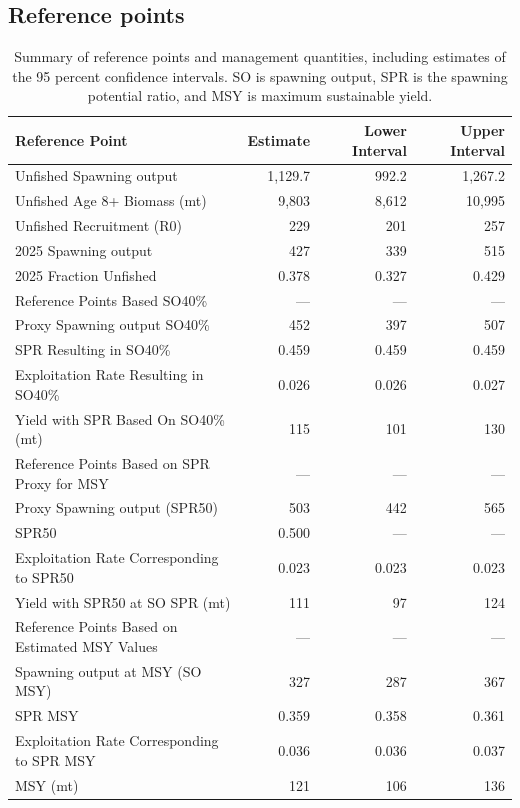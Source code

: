 \documentclass[
]{scrartcl}
\begin{document}
\subsection*{Reference points}\label{reference-points}

\begingroup
\fontsize{9.0pt}{10.8pt}\selectfont

\begin{longtable}{lrrr}

\caption{\label{tbl-ref-points-es-1}Summary of reference points and
management quantities, including estimates of the 95 percent confidence
intervals. SO is spawning output, SPR is the spawning potential ratio,
and MSY is maximum sustainable yield.}

\tabularnewline

\toprule
Reference Point & Estimate & Lower Interval & Upper Interval \\ 
\midrule\addlinespace[2.5pt]
Unfished Spawning output & 1,129.7 & 992.2 & 1,267.2 \\ 
Unfished Age 8+ Biomass (mt) & 9,803 & 8,612 & 10,995 \\ 
Unfished Recruitment (R0) & 229 & 201 & 257 \\ 
2025 Spawning output & 427 & 339 & 515 \\ 
2025 Fraction Unfished & 0.378 & 0.327 & 0.429 \\ 
Reference Points Based SO40\% & — & — & — \\ 
Proxy Spawning output SO40\% & 452 & 397 & 507 \\ 
SPR Resulting in SO40\% & 0.459 & 0.459 & 0.459 \\ 
Exploitation Rate Resulting in SO40\% & 0.026 & 0.026 & 0.027 \\ 
Yield with SPR Based On SO40\% (mt) & 115 & 101 & 130 \\ 
Reference Points Based on SPR Proxy for MSY & — & — & — \\ 
Proxy Spawning output (SPR50) & 503 & 442 & 565 \\ 
SPR50 & 0.500 & — & — \\ 
Exploitation Rate Corresponding to SPR50 & 0.023 & 0.023 & 0.023 \\ 
Yield with SPR50 at SO SPR (mt) & 111 & 97 & 124 \\ 
Reference Points Based on Estimated MSY Values & — & — & — \\ 
Spawning output at MSY (SO MSY) & 327 & 287 & 367 \\ 
SPR MSY & 0.359 & 0.358 & 0.361 \\ 
Exploitation Rate Corresponding to SPR MSY & 0.036 & 0.036 & 0.037 \\ 
MSY (mt) & 121 & 106 & 136 \\ 
\bottomrule

\end{longtable}
\end{document}
